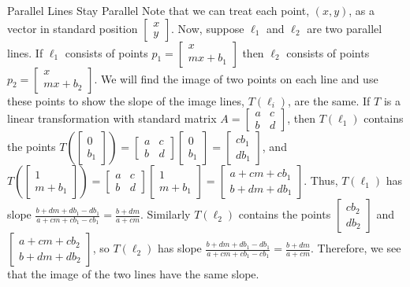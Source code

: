 {\begin{edXshowhide}{Parallel Lines Stay Parallel}
Note that we can treat each point, $(x,y)$, as a vector in standard position $\left[\begin{array}{c}  x\\ y   \end{array} \right]$.  Now, suppose $\ell_1$ and $\ell_2$ are two parallel lines.  If $\ell_1$ consists of points $p_1=\left[\begin{array}{c}  x\\ mx+b_1   \end{array} \right]$ then $\ell_2$ consists of points $p_2=\left[\begin{array}{c}  x\\ mx+b_2   \end{array} \right]$.  We will find the image of two points on each line and use these points to show the slope of the image lines, $T(\ell_i)$, are the same.   If $T$ is a linear transformation with standard matrix $A=\left[\begin{array}{cc} a & c\\ b& d   \end{array} \right]$, then $T(\ell_1)$ contains the points $T(\left[\begin{array}{c}  0\\ b_1   \end{array} \right])=\left[\begin{array}{cc} a & c\\ b& d   \end{array} \right]\left[\begin{array}{c}  0\\ b_1   \end{array} \right]=\left[\begin{array}{c}  cb_1\\ db_1   \end{array} \right]$, and $T(\left[\begin{array}{c}  1\\ m+b_1   \end{array} \right])=\left[\begin{array}{cc} a & c\\ b& d   \end{array} \right]\left[\begin{array}{c}  1\\ m+b_1   \end{array} \right]=\left[\begin{array}{c}  a+cm+cb_1\\ b+dm+db_1   \end{array} \right]$.  Thus, $T(\ell_1)$ has slope $\frac{b+dm+db_1-db_1}{a+cm+cb_1-cb_1}=\frac{b+dm}{a+cm}$.  Similarly $T(\ell_2)$ contains the points $\left[\begin{array}{c}  cb_2\\ db_2  \end{array} \right]$ and $\left[\begin{array}{c} a+cm+cb_2\\ b+dm+db_2  \end{array} \right]$, so $T(\ell_2)$ has slope $\frac{b+dm+db_1-db_1}{a+cm+cb_1-cb_1}=\frac{b+dm}{a+cm}$.  Therefore, we see that the image of the two lines have the same slope.


\end{edXshowhide}}
